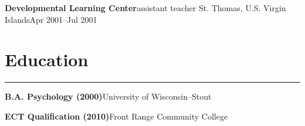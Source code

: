 \documentclass[letterpaper,10pt]{article}
\newcommand{\mblue}{\color{darkblue}}
\begin{document}
\vspace{1pc}
\textbf{Developmental Learning Center}\hfill assistant teacher
\smallbreak St. Thomas, U.S. Virgin Islands\hfill Apr 2001--Jul 2001


\section*{\mblue Education}

\vspace{-2.15pc}
{\hfill\mblue\rule{5.845in}{0.02cm}}

\vspace{1pc}
\textbf{B.A. Psychology (2000)}\hfill University of Wisconsin--Stout

\bigbreak \textbf{ECT Qualification (2010)}\hfill Front Range Community College
\end{document}
